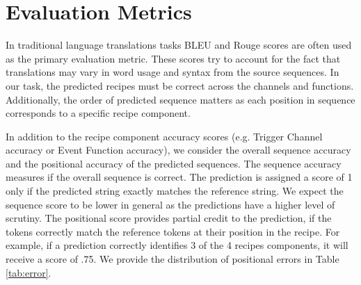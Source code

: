 \documentclass[letterpaper]{article} %
\begin{document}
\begin{table}
\centering
{}
\caption{Model performance on IFTTT recipes.}
\label{tab:ifttt_results}
\end{table}

\section{Evaluation Metrics}

In traditional language translations tasks BLEU and Rouge scores are often used as the primary evaluation metric. These scores try to account for the fact that translations may vary in word usage and syntax from the source sequences. In our task, the predicted recipes must be correct across the channels and functions. Additionally, the order of predicted sequence matters as each position in sequence corresponds to a specific recipe component.

In addition to the recipe component accuracy scores (e.g. Trigger Channel accuracy or Event Function accuracy), we consider the overall sequence accuracy and the positional accuracy of the predicted sequences. The sequence accuracy measures if the overall sequence is correct. The prediction is assigned a score of 1 only if the predicted string exactly matches the reference string. We expect the sequence score to be lower in general as the predictions have a higher level of scrutiny.  The positional score provides partial credit to the prediction, if the tokens correctly match the reference tokens at their position in the recipe. For example, if a prediction correctly identifies 3 of the 4 recipes components, it will receive a score of .75. We provide the distribution of positional errors in Table \ref{tab:error}.
\end{document}
